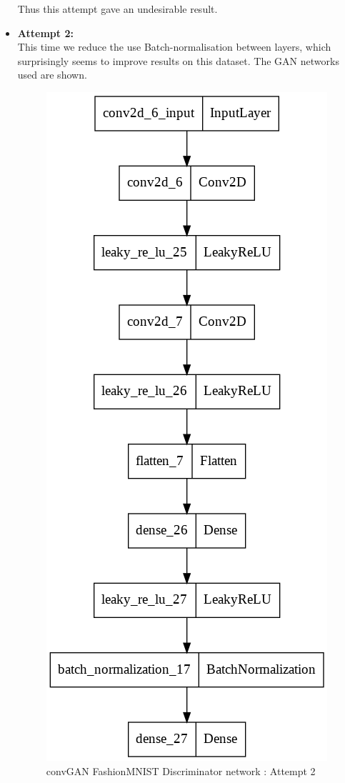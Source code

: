\documentclass[conference]{IEEEtran}
\begin{document}
\begin{itemize}
    Thus this attempt gave an undesirable result.\\
    \newpage
    \item \textbf{Attempt 2:}\\
    This time we reduce the use Batch-normalisation between layers, which surprisingly seems to improve results on this dataset. The GAN networks used are shown.\\
    
    \begin{figure}[h]
    \centering
    \includegraphics[scale = 0.3]{convGAN_FMNIST_disc_model.png}
      \caption{convGAN FashionMNIST Discriminator network : Attempt 2}
    \end{figure}
    

\end{itemize}
\end{document}
